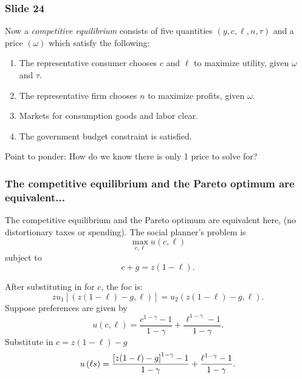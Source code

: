 \documentclass[aspectratio=169]{ltx-talk}
\begin{document}
\begin{frame}
\frametitle{Slide 24}
Now a \textit{competitive equilibrium} consists of five quantities $\left(
y,c,\ell ,n,\tau \right) $ and a price $\left( \omega \right) $ which
satisfy the following:

\begin{enumerate}
\item The representative consumer chooses $c$ and $\ell $ to maximize
utility, given $\omega $ and $\tau $.

\item The representative firm chooses $n$ to maximize profits, given $\omega 
$.

\item Markets for consumption goods and labor clear.

\item The government budget constraint is satisfied.
\end{enumerate}

Point to ponder: How do we know there is only 1 price to solve for?
\end{frame}

\begin{frame}
\frametitle{The competitive equilibrium and the Pareto optimum are equivalent...}
The competitive equilibrium and the Pareto optimum are equivalent here, (no
distortionary taxes or spending). The social planner's problem is 
\begin{equation*}
\underset{c,\ell }{\max }u\left( c,\ell \right)
\end{equation*}%
subject to 
\begin{equation*}
c+g=z(1-\ell ).
\end{equation*}

After substituting in for $c$, the foc is: 
\begin{equation*}
zu_{1}\left[ \left( z\left( 1-\ell \right) -g,\ell \right) \right]
=u_{2}\left( z\left( 1-\ell \right) -g,\ell \right) .
\end{equation*}%
Suppose preferences are given by 
\begin{equation*}
u\left( c,\ell \right) =\frac{c^{1-\gamma }-1}{1-\gamma }+\frac{\ell
^{1-\gamma }-1}{1-\gamma }.
\end{equation*}%
Substitute in $c=z(1-\ell )-g$ 
\begin{equation*}
u\left( \ell s\right) =\frac{\left[ z(1-\ell )-g\right] ^{1-\gamma }-1}{%
1-\gamma }+\frac{\ell ^{1-\gamma }-1}{1-\gamma }.
\end{equation*}%
\end{frame}
\end{document}
